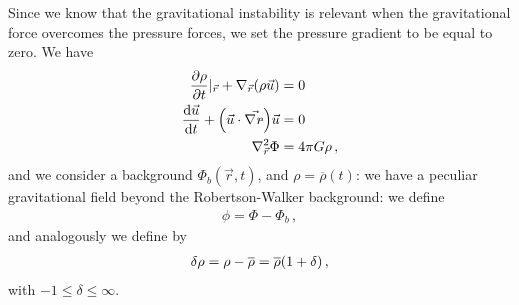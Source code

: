 \documentclass[main.tex]{subfiles}
\begin{document}





Since we know that the gravitational instability is relevant when the gravitational force overcomes the pressure forces, we set the pressure gradient to be equal to zero. We have 
%
\begin{subequations}
\begin{align}
  \pdv{\rho }{t} |_{\vec{r}} + \nabla_{\vec{r}} \qty(\rho \vec{u}) &= 0  \\
  \dv{\vec{u}}{t} + \qty(\vec{u} \cdot \vec{\nabla_{\vec{r}}}) \vec{u} &=0  \\
  \nabla_{\vec{r}}^2 \Phi &= 4 \pi G \rho 
\,,
\end{align}
\end{subequations}
%
and we consider a background \(\Phi_b (\vec{r}, t)\), and \(\rho = \overline{\rho}(t)\): we have a peculiar gravitational field beyond the Robertson-Walker background: we define 
%
\begin{align}
  \phi  = \Phi - \Phi_b
\,,
\end{align}
%
and analogously we define by 
%
\begin{align}
  \delta \rho = \rho - \overline{\rho} = \overline{\rho} \qty(1 + \delta )
\,,
\end{align}
%
with \(-1 \leq \delta \leq \infty\). 
\end{document}
